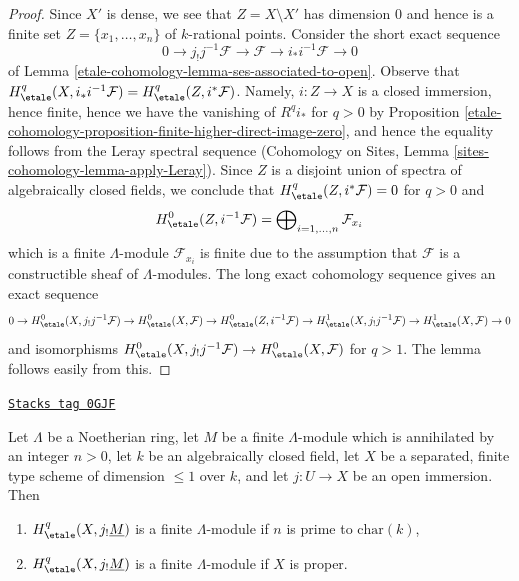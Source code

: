\begin{proof}
Since $X'$ is dense, we see that $Z = X \setminus X'$ has dimension $0$
and hence is a finite set $Z = \{x_1, \ldots, x_n\}$ of $k$-rational points.
Consider the short exact sequence
$$
0 \to j_!j^{-1}\mathcal{F} \to \mathcal{F} \to i_*i^{-1}\mathcal{F} \to 0
$$
of Lemma \ref{etale-cohomology-lemma-ses-associated-to-open}. Observe that
$H^q_\etale(X, i_*i^{-1}\mathcal{F}) = H^q_\etale(Z, i^*\mathcal{F})$.
Namely, $i : Z \to X$ is a closed immersion, hence finite,
hence we have the vanishing of $R^qi_*$ for $q > 0$ by
Proposition \ref{etale-cohomology-proposition-finite-higher-direct-image-zero}, and
hence the equality follows from the Leray spectral sequence
(Cohomology on Sites, Lemma \ref{sites-cohomology-lemma-apply-Leray}).
Since $Z$ is a disjoint union of spectra of algebraically closed
fields, we conclude that $H^q_\etale(Z, i^*\mathcal{F}) = 0$
for $q > 0$ and
$$
H^0_\etale(Z, i^{-1}\mathcal{F}) =
\bigoplus\nolimits_{i = 1, \ldots, n} \mathcal{F}_{x_i}
$$
which is a finite $\Lambda$-module $\mathcal{F}_{x_i}$ is finite due to the
assumption that $\mathcal{F}$ is a constructible sheaf of $\Lambda$-modules.
The long exact cohomology sequence gives an exact sequence
$$
0 \to
H^0_\etale(X, j_!j^{-1}\mathcal{F}) \to
H^0_\etale(X, \mathcal{F}) \to
H^0_\etale(Z, i^{-1}\mathcal{F}) \to
H^1_\etale(X, j_!j^{-1}\mathcal{F}) \to
H^1_\etale(X, \mathcal{F}) \to 0
$$
and isomorphisms $H^0_\etale(X, j_!j^{-1}\mathcal{F}) \to
H^0_\etale(X, \mathcal{F})$ for $q > 1$. The lemma follows easily from this.
\end{proof}

\begin{lemma}
\label{etale-cohomology-lemma-somewhat-easier-coefficients}
\href{https://stacks.math.columbia.edu/tag/0GJF}{\texttt{Stacks tag 0GJF}}

Let $\Lambda$ be a Noetherian ring, let $M$ be a finite $\Lambda$-module which
is annihilated by an integer $n > 0$, let $k$ be an algebraically closed field,
let $X$ be a separated, finite type scheme of dimension $\leq 1$ over $k$, and
let $j : U \to X$ be an open immersion. Then
\begin{enumerate}
\item $H^q_\etale(X, j_!\underline{M})$ is a finite $\Lambda$-module
if $n$ is prime to $\text{char}(k)$,
\item $H^q_\etale(X, j_!\underline{M})$ is a finite $\Lambda$-module
if $X$ is proper.
\end{enumerate}
\end{lemma}


